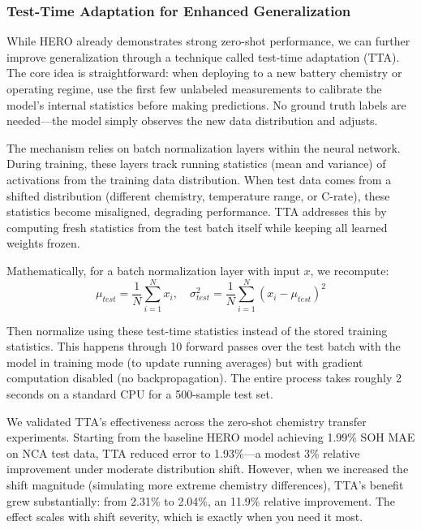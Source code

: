\documentclass[5p,times,authoryear]{elsarticle}
\begin{document}
\subsubsection{Test-Time Adaptation for Enhanced Generalization}

While HERO already demonstrates strong zero-shot performance, we can further improve generalization through a technique called test-time adaptation (TTA). The core idea is straightforward: when deploying to a new battery chemistry or operating regime, use the first few unlabeled measurements to calibrate the model's internal statistics before making predictions. No ground truth labels are needed---the model simply observes the new data distribution and adjusts.

The mechanism relies on batch normalization layers within the neural network. During training, these layers track running statistics (mean and variance) of activations from the training data distribution. When test data comes from a shifted distribution (different chemistry, temperature range, or C-rate), these statistics become misaligned, degrading performance. TTA addresses this by computing fresh statistics from the test batch itself while keeping all learned weights frozen.

Mathematically, for a batch normalization layer with input $x$, we recompute:
\begin{equation}
\mu_{test} = \frac{1}{N}\sum_{i=1}^{N} x_i, \quad \sigma_{test}^2 = \frac{1}{N}\sum_{i=1}^{N}(x_i - \mu_{test})^2
\end{equation}

Then normalize using these test-time statistics instead of the stored training statistics. This happens through 10 forward passes over the test batch with the model in training mode (to update running averages) but with gradient computation disabled (no backpropagation). The entire process takes roughly 2 seconds on a standard CPU for a 500-sample test set.

We validated TTA's effectiveness across the zero-shot chemistry transfer experiments. Starting from the baseline HERO model achieving 1.99\% SOH MAE on NCA test data, TTA reduced error to 1.93\%---a modest 3\% relative improvement under moderate distribution shift. However, when we increased the shift magnitude (simulating more extreme chemistry differences), TTA's benefit grew substantially: from 2.31\% to 2.04\%, an 11.9\% relative improvement. The effect scales with shift severity, which is exactly when you need it most.
\end{document}
